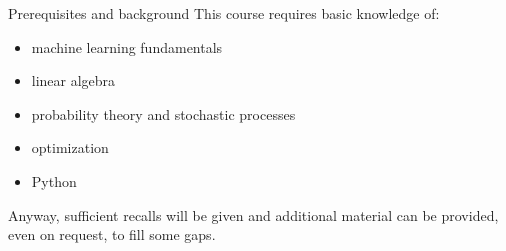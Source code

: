 \documentclass[xcolor=x11names,compress,10pt,unknownkeysallowed,aspectratio=169]{beamer}
\begin{document}
%
\begin{frame}{Prerequisites and background}
This course requires \alert{basic knowledge} of:

\vspace{0.2cm}
\begin{itemize}\justifying
	\item machine learning fundamentals

	\vspace{0.2cm}
	\item linear algebra
	
	\vspace{0.2cm}
	\item probability theory and stochastic processes

	\vspace{0.2cm}
	\item optimization
	
	\vspace{0.2cm}
	\item Python
\end{itemize}

\vspace{0.4cm}	
Anyway, sufficient \alert{recalls} will be given and \alert{additional material} can be provided, even on request, to fill some gaps.
\end{frame}
%
\end{document}
